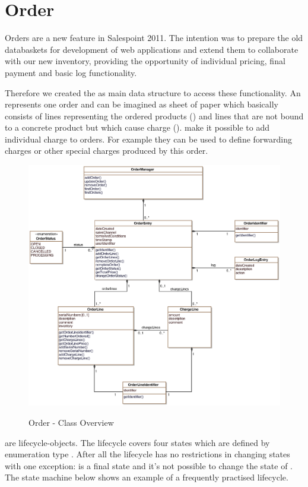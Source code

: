 \newpage
\section{Order}
Orders are a new feature in Salespoint 2011. The intention was to prepare the old databaskets for development of web applications and extend them to collaborate with our new inventory, providing the opportunity of individual pricing, final payment and basic log functionality.

Therefore we created the  as main data structure to access these functionality. An  represents one order and can be imagined as sheet of paper which basically consists of lines representing the ordered products () and lines that are not bound to a concrete product but which cause charge ().  make it possible to add individual charge to orders. For example they can be used to define forwarding charges or other special charges produced by this order. 

\vskip 1cm
\begin{figure}[ht]
	\centering
  \includegraphics[scale =.7]{images/Overview_Order.eps}
	\label{order_overview}
	\caption{Order - Class Overview}
\end{figure}

 are lifecycle-objects. The lifecycle covers four states which are defined by enumeration type . After all the lifecycle has no restrictions in changing states with one exception:  is a final state and it's not possible to change the state of  . The state machine below shows an example of a frequently practised lifecycle.

